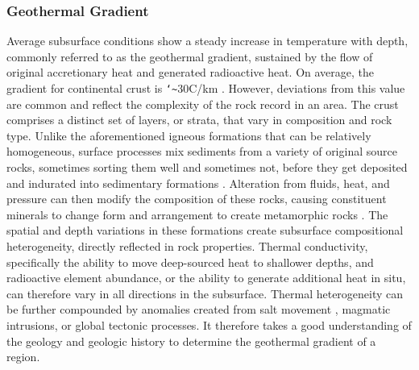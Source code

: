 \subsubsection{Geothermal Gradient}
Average subsurface conditions show a steady increase in temperature with depth, commonly referred to as the geothermal gradient, sustained by the flow of original accretionary heat and generated radioactive heat. On average, the gradient for continental crust is \texttt{\char`\~}30\textdegree C/km \citep[~p. 209]{press_understanding_2004}. However, deviations from this value are common and reflect the complexity of the rock record in an area. The crust comprises a distinct set of layers, or strata, that vary in composition and rock type. Unlike the aforementioned igneous formations that can be relatively homogeneous, surface processes mix sediments from a variety of original source rocks, sometimes sorting them well and sometimes not, before they get deposited and indurated into sedimentary formations \citep[~p. 164-168]{press_understanding_2004}. Alteration from fluids, heat, and pressure can then modify the composition of these rocks, causing constituent minerals to change form and arrangement to create metamorphic rocks \citep[~p. 195-205]{press_understanding_2004}. The spatial and depth variations in these formations create subsurface compositional heterogeneity, directly reflected in rock properties. Thermal conductivity, specifically the ability to move deep-sourced heat to shallower depths, and radioactive element abundance, or the ability to generate additional heat in situ, can therefore vary in all directions in the subsurface. Thermal heterogeneity can be further compounded by anomalies created from salt movement \citep[~p. 164-168]{press_understanding_2004}, magmatic intrusions, or global tectonic processes. It therefore takes a good understanding of the geology and geologic history to determine the geothermal gradient of a region.
